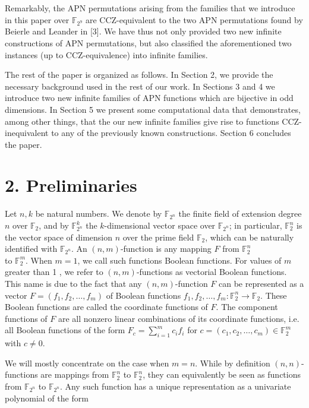 \documentclass[10pt]{article}
\begin{document}
Remarkably, the APN permutations arising from the families that we introduce in this paper over $\mathbb{F}_{2^{9}}$ are CCZ-equivalent to the two APN permutations found by Beierle and Leander in [3]. We have thus not only provided two new infinite constructions of APN permutations, but also classified the aforementioned two instances (up to CCZ-equivalence) into infinite families.

The rest of the paper is organized as follows. In Section 2, we provide the necessary background used in the rest of our work. In Sections 3 and 4 we introduce two new infinite families of APN functions which are bijective in odd dimensions. In Section 5 we present some computational data that demonstrates, among other things, that the our new infinite families give rise to functions CCZ-inequivalent to any of the previously known constructions. Section 6 concludes the paper.

\section*{2. Preliminaries}
Let $n, k$ be natural numbers. We denote by $\mathbb{F}_{2^{n}}$ the finite field of extension degree $n$ over $\mathbb{F}_{2}$, and by $\mathbb{F}_{2^{n}}^{k}$ the $k$-dimensional vector space over $\mathbb{F}_{2^{n}}$; in particular, $\mathbb{F}_{2}^{n}$ is the vector space of dimension $n$ over the prime field $\mathbb{F}_{2}$, which can be naturally identified with $\mathbb{F}_{2^{n}}$. An $(n, m)$-function is any mapping $F$ from $\mathbb{F}_{2}^{n}$\\
to $\mathbb{F}_{2}^{m}$. When $m=1$, we call such functions Boolean functions. For values of $m$ greater than 1 , we refer to $(n, m)$-functions as vectorial Boolean functions. This name is due to the fact that any $(n, m)$-function $F$ can be represented as a vector $F=\left(f_{1}, f_{2}, \ldots, f_{m}\right)$ of Boolean functions $f_{1}, f_{2}, \ldots, f_{m}: \mathbb{F}_{2}^{n} \rightarrow \mathbb{F}_{2}$. These Boolean functions are called the coordinate functions of $F$. The component functions of $F$ are all nonzero linear combinations of its coordinate functions, i.e. all Boolean functions of the form $F_{c}=\sum_{i=1}^{m} c_{i} f_{i}$ for $c=\left(c_{1}, c_{2}, \ldots, c_{m}\right) \in \mathbb{F}_{2}^{m}$ with $c \neq 0$.

We will mostly concentrate on the case when $m=n$. While by definition $(n, n)$-functions are mappings from $\mathbb{F}_{2}^{n}$ to $\mathbb{F}_{2}^{n}$, they can equivalently be seen as functions from $\mathbb{F}_{2^{n}}$ to $\mathbb{F}_{2^{n}}$. Any such function has a unique representation as a univariate polynomial of the form
\end{document}
